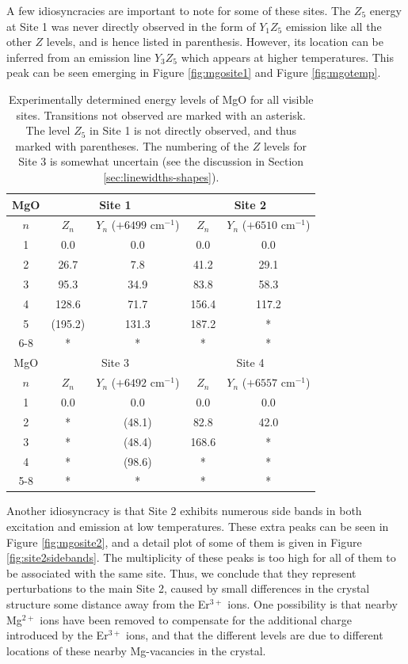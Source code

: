 \documentclass[12pt]{puthesis}
\newcommand{\erbium}[1][ ]{Er$^{3+}$#1}
\newcommand{\wn}{cm$^{-1}$}
\begin{document}
A few idiosyncracies are important to note for some of these sites. The $Z_{5}$ energy at Site 1 was never directly observed in the form of $Y_{1}Z_{5}$ emission like all the other $Z$ levels, and is hence listed in parenthesis. However, its location can be inferred from an emission line $Y_{3}Z_{5}$ which appears at higher temperatures. This peak can be seen emerging in Figure \ref{fig:mgosite1} and Figure \ref{fig:mgotemp}.

\begin{table}[t]
  \centering
  \begin{tabular}{| c | c | c | c | c |}
    \hline
    MgO & \multicolumn{2}{c|}{Site 1}& \multicolumn{2}{c|}{Site 2} \\
    \hline
    $n$ & $Z_{n}$ & $Y_{n}$ ($+6499$ \wn) & $Z_{n}$ & $Y_{n}$ ($+6510$ \wn) \\
    \hline 
    1 & 0.0 & 0.0 & 0.0 & 0.0 \\
    2 & 26.7 & 7.8 & 41.2 & 29.1 \\
    3 & 95.3 & 34.9 & 83.8 & 58.3 \\
    4 & 128.6 & 71.7 & 156.4 & 117.2 \\
    5 & (195.2) & 131.3 & 187.2 & * \\
    6-8 & * & * & * & * \\
    \hline \hline
    MgO & \multicolumn{2}{c|}{Site 3}& \multicolumn{2}{c|}{Site 4} \\
    \hline
    $n$ & $Z_{n}$ & $Y_{n}$ ($+6492$ \wn) & $Z_{n}$ & $Y_{n}$ ($+6557$ \wn)\\
    \hline 
    1 & 0.0 & 0.0 & 0.0 & 0.0  \\
    2 & * & (48.1) & 82.8 & 42.0 \\
    3 & * & (48.4) & 168.6 & *  \\
    4 & * & (98.6) & * & * \\
    5-8 & * & * & * & * \\
    \hline
  \end{tabular}
  \caption{Experimentally determined energy levels of MgO for all visible sites. Transitions not observed are marked with an asterisk. The level $Z_{5}$ in Site 1 is not directly observed, and thus marked with parentheses. The numbering of the $Z$ levels for Site 3 is somewhat uncertain (see the discussion in Section \ref{sec:linewidths-shapes}).}
  \label{tab:mgolevels}
\end{table}

Another idiosyncracy is that Site 2 exhibits numerous side bands in both excitation and emission at low temperatures. These extra peaks can be seen in Figure \ref{fig:mgosite2}, and a detail plot of some of them is given in Figure \ref{fig:site2sidebands}. The multiplicity of these peaks is too high for all of them to be associated with the same site. Thus, we conclude that they represent perturbations to the main Site 2, caused by small differences in the crystal structure some distance away from the \erbium ions. One possibility is that nearby Mg$^{2+}$ ions have been removed to compensate for the additional charge introduced by the \erbium ions, and that the different levels are due to different locations of these nearby Mg-vacancies in the crystal.
\end{document}
